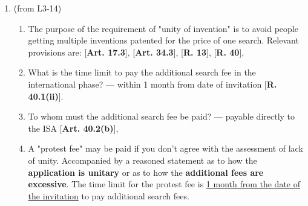 \documentclass{report}
\begin{document}
\begin{enumerate}[label=\textbf{Answer \arabic*}]
\begin{enumerate}[label=(\alph*)]
        \item (from L3-14)
        \begin{enumerate}[label={(\alph{enumi}.\arabic*)}]
            \item The purpose of the requirement of "unity of invention" is to avoid people getting multiple inventions patented for the price of one search. Relevant provisions are: [\textbf{Art. 17.3}], [\textbf{Art. 34.3}], [\textbf{R. 13}], [\textbf{R. 40}],
            \item What is the time limit to pay the additional search fee in the international phase? --- within 1 month from date of invitation [\textbf{R. 40.1(ii)}].
            \item To whom must the additional search fee be paid? --- payable directly to the ISA [\textbf{Art. 40.2(b)}],
            \item A "protest fee" may be paid if you don't agree with the assessment of lack of unity. Accompanied by a reasoned statement as to how the \textbf{application is unitary} or as to how the \textbf{additional fees are excessive}. The time limit for the protest fee is \underline{1 month from the date of the invitation} to pay additional search fees. 
        \end{enumerate}
    \end{enumerate}


\end{enumerate}
\end{document}
